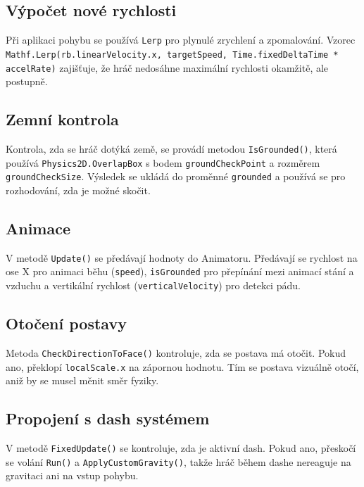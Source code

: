 \subsection{Výpočet nové rychlosti}
Při aplikaci pohybu se používá \texttt{Lerp} pro plynulé zrychlení a zpomalování. Vzorec \texttt{ Mathf.Lerp(rb.linearVelocity.x, targetSpeed, Time.fixedDeltaTime * accelRate)} zajišťuje, že hráč nedosáhne maximální rychlosti okamžitě, ale postupně.

\subsection{Zemní kontrola}
Kontrola, zda se hráč dotýká země, se provádí metodou \texttt{IsGrounded()}, která používá \texttt{Physics2D.OverlapBox} s bodem \texttt{groundCheckPoint} a rozměrem \texttt{groundCheckSize}. Výsledek se ukládá do proměnné \texttt{grounded} a používá se pro rozhodování, zda je možné skočit.

\subsection{Animace}
V metodě \texttt{Update()} se předávají hodnoty do Animatoru. Předávají se rychlost na ose X pro animaci běhu (\texttt{speed}), \texttt{isGrounded} pro přepínání mezi animací stání a vzduchu a vertikální rychlost (\texttt{verticalVelocity}) pro detekci pádu.

\subsection{Otočení postavy}
Metoda \texttt{CheckDirectionToFace()} kontroluje, zda se postava má otočit. Pokud ano, překlopí \texttt{localScale.x} na zápornou hodnotu. Tím se postava vizuálně otočí, aniž by se musel měnit směr fyziky.

\subsection{Propojení s dash systémem}
V metodě \texttt{FixedUpdate()} se kontroluje, zda je aktivní dash. Pokud ano, přeskočí se volání \texttt{Run()} a \texttt{ApplyCustomGravity()}, takže hráč během dashe nereaguje na gravitaci ani na vstup pohybu.
